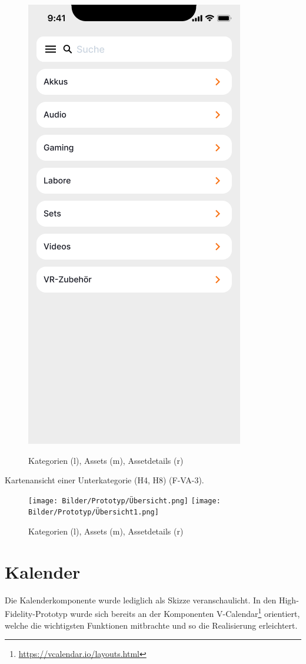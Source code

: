 \begin{figure}[h]
    \includegraphics[scale=0.3]{Bilder/Prototyp/Neu/Kategorein 1.png}
    \label{fig:p1}
    \caption[Mockup: Kategorien, Assets, Assetdetails]{Kategorien (l), Assets (m), Assetdetails (r)}
\end{figure}

Kartenansicht einer Unterkategorie (H4, H8) (F-VA-3).

\begin{figure}[h]
    \centering
    \texttt{[image: Bilder/Prototyp/Übersicht.png]}
    \texttt{[image: Bilder/Prototyp/Übersicht1.png]}
    \label{fig:p4}
    \caption[Mockup: Kategorien, Assets, Assetdetails]{Kategorien (l), Assets (m), Assetdetails (r)}
\end{figure}


\section{Kalender}
Die Kalenderkomponente wurde lediglich als Skizze veranschaulicht. In den High-Fidelity-Prototyp
wurde sich bereits an der Komponenten V-Calendar\footnote{\url{https://vcalendar.io/layouts.html}}
orientiert, welche die wichtigsten Funktionen mitbrachte und so die Realisierung erleichtert.

